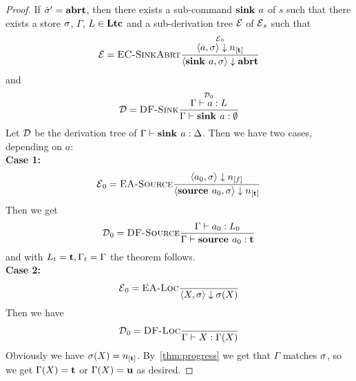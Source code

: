 \begin{proof}
    If $\hat{\sigma}{}' = \textbf{abrt}$, then there exists a sub-command $\textbf{sink }{a}$ of $s$
    such that there exists a store $\sigma$, $\Gamma$, $L \in \textbf{Ltc}$ and a sub-derivation tree $\operatorname{\mathcal{E}}$ of $\operatorname{\mathcal{E}}_s$
    such that
    \begin{align*}
        \E = \bsrule{EC-SinkAbrt}{\overset{\E_0}{\bigstep{a}{\store}{\tracked{}}}}
        {\bigstep{\defaultsink}{\store}{\exception}}
    \end{align*}
    and
    \begin{align*}
        \operatorname{\mathcal{D}} = \textsc{DF-Sink}\frac{\displaystyle \overset{\operatorname{\mathcal{D}}_0}{\Gamma \vdash {a}: L}}{\displaystyle \Gamma \vdash {\textbf{sink }{a}}: \emptyset}
    \end{align*}
    Let $\operatorname{\mathcal{D}}$ be the derivation tree of $\Gamma \vdash {\textbf{sink }{a}}: \Delta$.
    Then we have two cases, depending on $a$:\\
    \textbf{Case 1:}
    \begin{align*}
        \E_0 = \bsrule{EA-Source}{\bigstep{a_0}{\store}{\flagged}}
        {\bigstep{\source{a_0}}{\store}{\tracked}}
    \end{align*}
    Then we get
    \begin{align*}
        \operatorname{\mathcal{D}}_0 = \textsc{DF-Source}\frac{\displaystyle \Gamma \vdash {a_0}: L_0}{\displaystyle \Gamma \vdash {\textbf{source }{a_0}}: \textbf{t}}
    \end{align*}
    and with $L_t = \textbf{t}, \Gamma_t = \Gamma$ the theorem follows.\\
    \textbf{Case 2:}
    \begin{align*}
        \operatorname{\mathcal{E}}_0 = \textsc{EA-Loc}\frac{\displaystyle }{\displaystyle \langle X, \sigma \rangle \downarrow \sigma(X)}
    \end{align*}
    Then we have 
    \begin{align*}
        \operatorname{\mathcal{D}}_0 = \textsc{DF-Loc}\frac{\displaystyle }{\displaystyle \Gamma \vdash {X}: \Gamma(X)}
    \end{align*}
    Obviously we have $\store(X) = \tracked$.
    By~\autoref{thm:progress} we get that $\Gamma$ matches $\sigma$, so we get 
    $\Gamma(X) = \textbf{t}$ or $\Gamma(X)= \textbf{u}$ as desired.
\end{proof}

